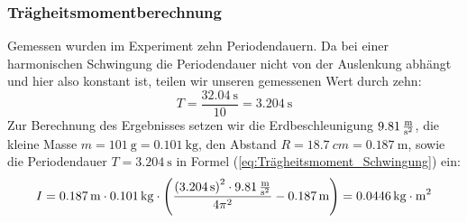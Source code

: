 \documentclass{article}
\begin{document}
	\subsubsection{Trägheitsmomentberechnung}
	Gemessen wurden im Experiment zehn Periodendauern. Da bei einer harmonischen Schwingung die Periodendauer nicht von der Auslenkung abhängt und hier also konstant ist, teilen wir unseren gemessenen Wert durch zehn:
	\begin{equation}
		T = \frac{ \SI{32,04}{\second} }{ 10 } = \SI{3,204}{\second}
	\end{equation}
	Zur Berechnung des Ergebnisses setzen wir die Erdbeschleunigung \(\SI{9,81}{\frac{\metre}{\second^2}}\), die kleine Masse \(m = \SI{101}{\gram} = \SI{0,101}{\kilogram} \),
	den Abstand \(R = \SI{18,7}{cm} = \SI{0,187}{\metre} \), sowie die Periodendauer \( T = \SI{3,204}{\second} \) in Formel (\ref{eq:Trägheitsmoment_Schwingung}) ein:
	\begin{equation}
		I = \SI{0,187}{\metre} \cdot \SI{0,101}{\kilogram} \cdot \left( \frac{ {( \SI{3,204}{\second} )}^2 \cdot \SI{9,81}{\frac{\metre}{\second^2}} }{ 4 \pi^2 } - \SI{0,187}{\metre} \right) = \SI{0,0446}{\kilogram \cdot \metre^2}
	\end{equation}
\end{document}
